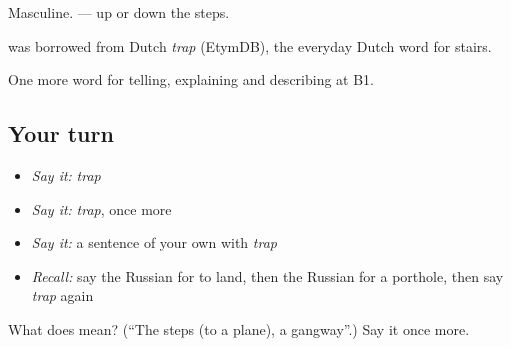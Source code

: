 Masculine. \emph{ } — up or down the steps.

\begin{cousinweb}
\emph{} was borrowed from Dutch \emph{trap} (EtymDB), the everyday Dutch word for stairs.
\end{cousinweb}

\begin{grammarlens}[title={What you've built}]
One more word for telling, explaining and describing at B1.
\end{grammarlens}

\subsection*{Your turn}
\begin{itemize}
\raggedright
  \item \emph{Say it:} \emph{trap}
  \item \emph{Say it:} \emph{trap}, once more
  \item \emph{Say it:} a sentence of your own with \emph{trap}
  \item \emph{Recall:} say the Russian for to land, then the Russian for a porthole, then say \emph{trap} again
\end{itemize}

\begin{tcolorbox}[breakable,colback=teal!4,colframe=teal!35!black,title={Before you move on}]
What does  mean? (\textquotedblleft{}The steps (to a plane), a gangway\textquotedblright{}.) Say it once more.
\end{tcolorbox}
